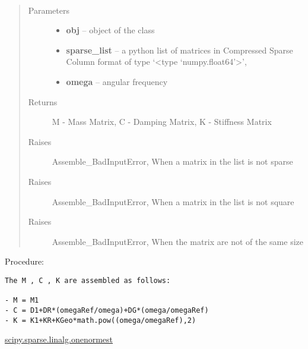 \documentclass[letterpaper,10pt,english]{sphinxmanual}
\begin{document}
\begin{fulllineitems}
\label{index:brake.initialize.assemble.create_MCK}~\begin{quote}\begin{description}
\item[{Parameters}] \leavevmode\begin{itemize}
\item {} 
\textbf{obj} -- object of the class 

\item {} 
\textbf{sparse\_list} -- a python list of matrices in Compressed Sparse Column format 
of type `\textless{}type `numpy.float64'\textgreater{}',

\item {} 
\textbf{omega} -- angular frequency

\end{itemize}

\item[{Returns}] \leavevmode
M - Mass Matrix, C - Damping Matrix, K - Stiffness Matrix

\item[{Raises }] \leavevmode
Assemble\_BadInputError, When a matrix in the list is not sparse

\item[{Raises }] \leavevmode
Assemble\_BadInputError, When a matrix in the list is not square

\item[{Raises }] \leavevmode
Assemble\_BadInputError, When the matrix  are not of the same size

\end{description}\end{quote}

Procedure:

\begin{Verbatim}[commandchars=\\\{\}]
The M , C , K are assembled as follows:

- M = M1
- C = D1+DR*(omegaRef/omega)+DG*(omega/omegaRef)
- K = K1+KR+KGeo*math.pow((omega/omegaRef),2)
\end{Verbatim}

\end{fulllineitems}





\href{http://docs.scipy.org/doc/scipy-dev/reference/generated/scipy.sparse.linalg.onenormest.html}{scipy.sparse.linalg.onenormest}
\end{document}
